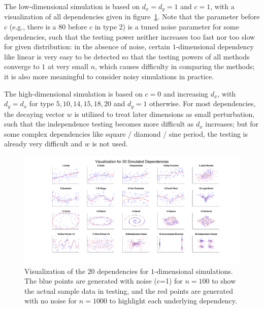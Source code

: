 \documentclass[11pt]{article}
\begin{document}
%
%
%
%

The low-dimensional simulation is based on $d_{x}=d_{y}=1$ and $c=1$, with a visualization of all dependencies given in figure~\ref{fig0}. Note that the parameter before $c$ (e.g., there is a $80$ before $c$ in type 2) is a tuned noise parameter for some dependencies, such that the testing power neither increases too fast nor too slow for given distribution: in the absence of noise, certain $1$-dimensional dependency like linear is very easy to be detected so that the testing powers of all methods converge to $1$ at very small $n$, which causes difficulty in comparing the methods; it is also more meaningful to consider noisy simulations in practice. 

The high-dimensional simulation is based on $c=0$ and increasing $d_{x}$, with $d_{y}=d_{x}$ for type $5,10,14,15,18,20$ and $d_{y}=1$ otherwise. For most dependencies, the decaying vector $w$ is utilized to treat later dimensions as small perturbation, such that the independence testing becomes more difficult as $d_{x}$ increases; but for some complex dependencies like square / diamond / sine period, the testing is already very difficult and $w$ is not used.

\begin{figure}[htbp]
\includegraphics[trim={5cm 0 3.5cm 0},clip, width=1.0\textwidth]{Figures/Fig0}
\caption{Visualization of the $20$ dependencies for $1$-dimensional simulations. The blue points are generated with noise (c=1) for $n=100$ to show the actual sample data in testing, and the red points are generated with no noise for $n=1000$ to highlight each underlying dependency.
}
\label{fig0}
\end{figure}
\end{document}
